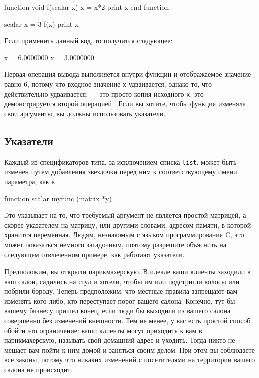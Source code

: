 \begin{code}
function void f(scalar x)
    x = x*2
    print x
end function

scalar x = 3
f(x)
print x
\end{code}
Если применить данный код, то получится следующее:
\begin{code}
              x =  6.0000000
              x =  3.0000000
\end{code}
Первая операция вывода  выполняется внутри функции и
отображаемое значение равно 6, потому что входное значение \verb|x|
удваивается; однако то, что действительно удваивается, --- это просто
копия исходного \verb|x|: это демонстрируется второй операцией
. Если вы хотите, чтобы функция изменяла свои аргументы, вы
должны использовать указатели.


\subsection{Указатели}

Каждый из спецификаторов типа, за исключением списка \texttt{list},
может быть изменен путем добавления звездочки перед ним к
соответствующему имени параметра, как в
  
\begin{code}
function scalar myfunc (matrix *y)
\end{code}
Это указывает на то, что требуемый аргумент не является простой
матрицей, а скорее указателем на матрицу, или другими словами, адресом
памяти, в которой хранится переменная.  Людям, незнакомым с языком
программирования C, это может показаться немного загадочным, поэтому
разрешите объяснить на следующем отвлеченном примере, как работают
указатели.

Предположим, вы открыли парикмахерскую. В идеале ваши клиенты заходили
в ваш салон, садились на стул и хотели, чтобы им или подстригли волосы
или побрили бороду. Теперь предположим, что местные правила запрещают
вам изменять кого-либо, кто переступает порог вашего салона. Конечно,
тут бы вашему бизнесу пришел конец, если люди бы выходили из вашего
салона совершенно без изменений внешности. Тем не менее, у вас есть
простой способ обойти это ограничение: ваши клиенты могут приходить к
вам в парикмахерскую, называть свой домашний адрес и уходить. Тогда
никто не мешает вам пойти к ним домой и заняться своим делом. При этом
вы соблюдаете все законы, потому что никаких изменений с посетителями
на территории вашего салона не происходит.

